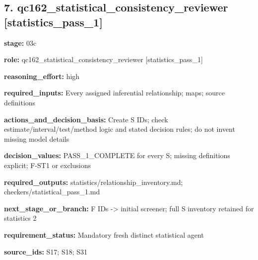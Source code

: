 \documentclass[10pt,a4paper]{article}
\begin{document}
\subsection*{7.\allowbreak{} qc162\_\allowbreak{}statistical\_\allowbreak{}consistency\_\allowbreak{}reviewer [statistics\_\allowbreak{}pass\_\allowbreak{}1]}
\textbf{stage:} 03c\par
\textbf{role:} qc162\_\allowbreak{}statistical\_\allowbreak{}consistency\_\allowbreak{}reviewer [statistics\_\allowbreak{}pass\_\allowbreak{}1]\par
\textbf{reasoning\_\allowbreak{}effort:} high\par
\textbf{required\_\allowbreak{}inputs:} Every assigned inferential relationship; maps; source definitions\par
\textbf{actions\_\allowbreak{}and\_\allowbreak{}decision\_\allowbreak{}basis:} Create S IDs; check estimate/\allowbreak{}interval/\allowbreak{}test/\allowbreak{}method logic and stated decision rules; do not invent missing model details\par
\textbf{decision\_\allowbreak{}values:} PASS\_\allowbreak{}1\_\allowbreak{}COMPLETE for every S; missing definitions explicit; F-\allowbreak{}ST1 or exclusions\par
\textbf{required\_\allowbreak{}outputs:} statistics/\allowbreak{}relationship\_\allowbreak{}inventory.\allowbreak{}md; checkers/\allowbreak{}statistical\_\allowbreak{}pass\_\allowbreak{}1.\allowbreak{}md\par
\textbf{next\_\allowbreak{}stage\_\allowbreak{}or\_\allowbreak{}branch:} F IDs -\allowbreak{}> initial screener; full S inventory retained for statistics 2\par
\textbf{requirement\_\allowbreak{}status:} Mandatory fresh distinct statistical agent\par
\textbf{source\_\allowbreak{}ids:} S17; S18; S31\par
\end{document}

